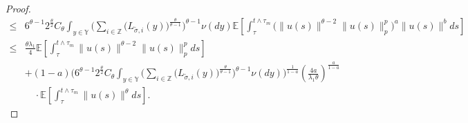 \documentclass[11pt]{article}
\numberwithin{equation}{section}
\theoremstyle{plain}
\begin{document}
\begin{proof}
\begin{align}
 \le & 6^{\theta-1} 2^{\frac{\theta}{2}} C_{\theta} 
                    \int_{y \in \mathbb{Y} } 
 	                            \Big( \sum_{i \in \mathbb{Z}}
 	                                             \big( L_{\tilde{\sigma},i}(y) 
 	                                             \big)^{\frac{\theta}{\theta-1}}
 	                            \Big)^{\theta-1} \nu (dy)  
 	               \mathbb{E} 
 	                        \left[ \int_{\tau}^{t \wedge \tau_m}
 	                                     \big( \|u(s)\|^{\theta-2} \|u(s)\|_{p}^{p} 
 	                                     \big)^{a}
                                     	\|u(s)\|^{b} ds 
                        	\right]  \nonumber\\
 \le & \frac{\theta \lambda_1 }{4}
 	                     \mathbb{E} 
 	                           \left[ \int_{\tau}^{t \wedge \tau_m} 
                                          	\|u(s)\|^{\theta -2} \|u(s)\|_p^{p} ds
                               \right]  \nonumber\\
 	  & + (1-a) 
 	            \bigg( 6^{\theta-1} 2^{\frac{\theta}{2}} C_{\theta}  
                              \int_{y \in \mathbb{Y} } 
                       	          \Big( \sum_{i \in \mathbb{Z}}
 	                                                \big( L_{\tilde{\sigma},  i}(y) \big)^{\frac{\theta}{\theta-1}}
 	                              \Big)^{\theta-1} \nu(dy) 
 	            \bigg)^{\frac{1}{1-a}} 
 	            \left( \frac{4 a}{\lambda_1 \theta}
 	            \right)^{\frac{a}{1-a}}  \nonumber\\
 	    & \quad
 	           \cdot \mathbb{E} 
 	                           \left[ \int_{\tau}^{t \wedge \tau_m} \|u(s)\|^{\theta} ds
 	                          \right].
 \end{align}
 

\end{proof}
\end{document}

